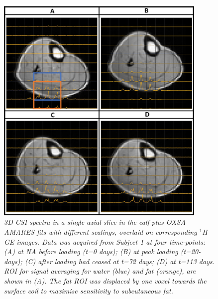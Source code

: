 \begin{figure}
    \centering
    \includegraphics[width=0.9\textwidth]{Figures/Lipid/Calf.png}
    \caption{\textit{3D \ac{CSI} spectra in a single axial slice in the calf plus OXSA-AMARES fits with different scalings, overlaid on corresponding $^1$H \ac{GE} images. Data was acquired from Subject 1 at four time-points: (A) at \ac{NA} before loading (t=0 days); (B) at peak loading (t=20-days); (C) after loading had ceased at t=72 days; (D) at t=113 days. ROI for signal averaging for water (blue) and fat (orange), are shown in (A). The fat \ac{ROI} was displaced by one voxel towards the surface coil to maximise sensitivity to subcutaneous fat.}}
    \label{fig:Lip:Calf}
\end{figure}


